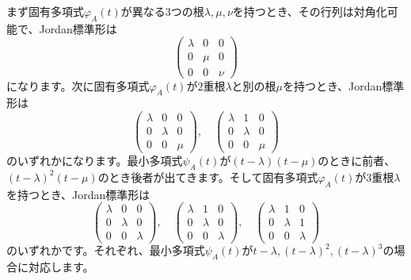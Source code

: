 まず固有多項式$\varphi_A(t)$が異なる$3$つの根$\lambda, \mu, \nu$を持つとき、その行列は対角化可能で、Jordan標準形は
\[
\begin{pmatrix}
\lambda & 0 & 0 \\
0 & \mu & 0 \\
0 & 0 & \nu
\end{pmatrix}
\]
になります。次に固有多項式$\varphi_A(t)$が$2$重根$\lambda$と別の根$\mu$を持つとき、Jordan標準形は
\[
\begin{pmatrix}
\lambda & 0 & 0 \\
0 & \lambda & 0 \\
0 & 0 & \mu
\end{pmatrix}, \quad
\begin{pmatrix}
\lambda & 1 & 0 \\
0 & \lambda & 0 \\
0 & 0 & \mu
\end{pmatrix}
\]
のいずれかになります。最小多項式$\psi_A(t)$が$(t - \lambda)(t - \mu)$のときに前者、$(t - \lambda)^2 (t - \mu)$のとき後者が出てきます。そして固有多項式$\varphi_A(t)$が$3$重根$\lambda$を持つとき、Jordan標準形は
\[
\begin{pmatrix}
\lambda & 0 & 0 \\
0 & \lambda & 0 \\
0 & 0 & \lambda
\end{pmatrix}, \quad
\begin{pmatrix}
\lambda & 1 & 0 \\
0 & \lambda & 0 \\
0 & 0 & \lambda
\end{pmatrix}, \quad
\begin{pmatrix}
\lambda & 1 & 0 \\
0 & \lambda & 1 \\
0 & 0 & \lambda
\end{pmatrix}
\]
のいずれかです。それぞれ、最小多項式$\psi_A(t)$が$t - \lambda, (t - \lambda)^2, (t - \lambda)^3$の場合に対応します。

